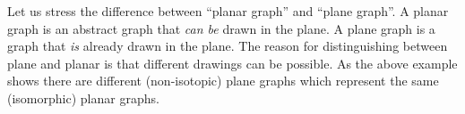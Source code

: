 

\setcounter{section}{3}
\setcounter{subsection}{1}
\setcounter{dfn}{2}

\begin{rem}
Let us stress the difference between ``planar graph'' and ``plane graph''.
A planar graph is an abstract graph that \emph{can be} drawn in the plane.
A plane graph is a graph that \emph{is} already drawn in the plane.
The reason for distinguishing between plane and planar is that different drawings can be possible.
As the above example shows there are different (non-isotopic) plane graphs which represent the same (isomorphic) planar graphs.
\end{rem}

